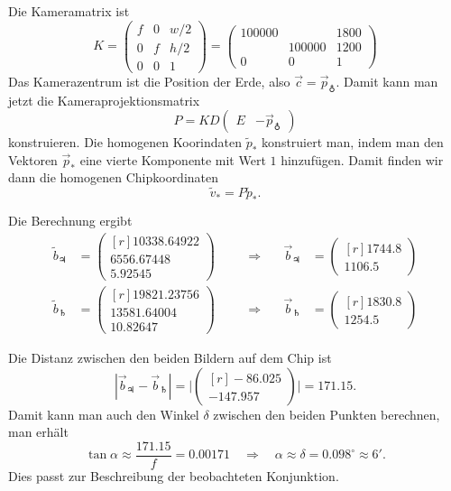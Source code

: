 
\begin{loesung}
Die Kameramatrix ist
\[
K
=
\begin{pmatrix}
f&0&w/2\\
0&f&h/2\\
0&0& 1
\end{pmatrix}
=
\begin{pmatrix}
100000&      &1800\\
      &100000&1200\\
   0  &   0  &  1
\end{pmatrix}
\]
Das Kamerazentrum ist die Position der Erde, also $\vec{c}=\vec{p}_{\earth}$.
Damit kann man jetzt die Kameraprojektionsmatrix
\[
P = K D \begin{pmatrix} E&-\vec{p}_{\earth}\end{pmatrix}
\]
konstruieren.
Die homogenen Koorindaten $\tilde{p}_*$ konstruiert man, indem man den
Vektoren $\vec{p}_*$ eine vierte Komponente mit Wert $1$ hinzufügen.
Damit finden wir dann die homogenen Chipkoordinaten 
\[
\tilde{v}_* = P \tilde{p}_*.
\]
\begin{teilaufgaben}
\item
Die Berechnung ergibt
\[
\begin{aligned}
\tilde{b}_{\jupiter}
&=
\begin{pmatrix*}[r]
   10338.64922\\
    6556.67448\\
       5.92545
\end{pmatrix*}
&&\quad\Rightarrow\quad&
\vec{b}_{\jupiter}
&=
\begin{pmatrix*}[r]
   1744.8\\
   1106.5
\end{pmatrix*}
\\
\tilde{b}_{\saturn}
&=
\begin{pmatrix*}[r]
   19821.23756\\
   13581.64004\\
      10.82647
\end{pmatrix*}
&&\quad\Rightarrow\quad&
\vec{b}_{\saturn}
&=
\begin{pmatrix*}[r]
   1830.8\\
   1254.5
\end{pmatrix*}
\end{aligned}
\]
\item
Die Distanz zwischen den beiden Bildern auf dem Chip ist
\[
|\vec{b}_{\jupiter}-\vec{b}_{\saturn}|
=
\biggl|
\begin{pmatrix*}[r]
   -86.025\\
  -147.957
\end{pmatrix*}
\biggr|
=  171.15.
\]
Damit kann man auch den Winkel $\delta$ zwischen den beiden Punkten berechnen,
man erhält
\[
\tan \alpha \approx \frac{171.15}{f} = 0.00171
\quad\Rightarrow\quad
\alpha\approx
\delta =  0.098^\circ \approx 6'.
\]
Dies passt zur Beschreibung der beobachteten Konjunktion.
\qedhere
\end{teilaufgaben}
\end{loesung}

